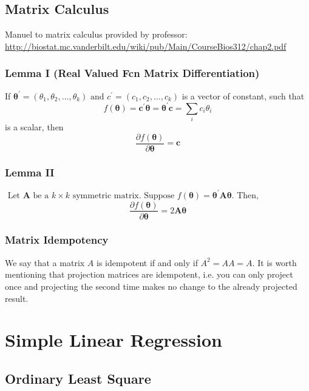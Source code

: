 \documentclass[11pt]{article}
\begin{document}
\subsection{Matrix Calculus}
Manuel to matrix calculus provided by professor: \url{http://biostat.mc.vanderbilt.edu/wiki/pub/Main/CourseBios312/chap2.pdf}
\subsubsection{Lemma I (Real Valued Fcn Matrix Differentiation)} If $\boldsymbol{\theta}^{\prime}=\left(\theta_{1}, \theta_{2}, \ldots, \theta_{k}\right) \text { and } c^{\prime}=\left(c_{1}, c_{2}, \ldots, c_{k}\right)$ is a vector of constant, such that 
\begin{equation*}
    f(\boldsymbol{\theta})=\mathbf{c}^{\prime} \boldsymbol{\theta}=\boldsymbol{\theta}^{\prime} \mathbf{c}=\sum_{i} c_{i} \theta_{i}
\end{equation*}
is a scalar, then
\begin{equation*}
    \frac{\partial f(\boldsymbol{\theta})}{\partial \boldsymbol{\theta}}=\mathbf{c}
\end{equation*}
\subsubsection{Lemma II}
$\text { Let } \mathbf{A} \text { be a } k \times k \text { symmetric matrix. Suppose } f(\boldsymbol{\theta})=\boldsymbol{\theta}^{\prime} \mathbf{A} \boldsymbol{\theta}$. Then,
\begin{equation*}
    \frac{\partial f(\boldsymbol{\theta})}{\partial \boldsymbol{\theta}}=2 \mathbf{A} \boldsymbol{\theta}
\end{equation*}
\subsubsection{Matrix Idempotency}
We say that a matrix $A$ is idempotent if and only if $A^2 = AA = A$. It is worth mentioning that projection matrices are idempotent, i.e. you can only project once and projecting the second time makes no change to the already projected result.


\section{Simple Linear Regression}
\subsection{Ordinary Least Square}
\end{document}
